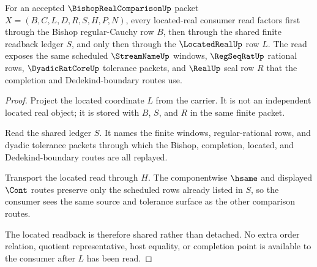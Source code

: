 \begin{theorem}
\label{thm:bishop-real-comparison-located-readback}
For an accepted $\BishopRealComparisonUp$ packet $X=(B,C,L,D,R,S,H,P,N)$, every located-real consumer read factors first through the Bishop regular-Cauchy row $B$, then through the shared finite readback ledger $S$, and only then through the $\LocatedRealUp$ row $L$. The read exposes the same scheduled $\StreamNameUp$ windows, $\RegSeqRatUp$ rational rows, $\DyadicRatCoreUp$ tolerance packets, and $\RealUp$ seal row $R$ that the completion and Dedekind-boundary routes use.
\end{theorem}
\begin{proof}
Project the located coordinate $L$ from the carrier. It is not an independent located real object; it is stored with $B$, $S$, and $R$ in the same finite packet.

Read the shared ledger $S$. It names the finite windows, regular-rational rows, and dyadic tolerance packets through which the Bishop, completion, located, and Dedekind-boundary routes are all replayed.

Transport the located read through $H$. The componentwise $\hsame$ and displayed $\Cont$ routes preserve only the scheduled rows already listed in $S$, so the consumer sees the same source and tolerance surface as the other comparison routes.

The located readback is therefore shared rather than detached. No extra order relation, quotient representative, host equality, or completion point is available to the consumer after $L$ has been read.
\end{proof}

